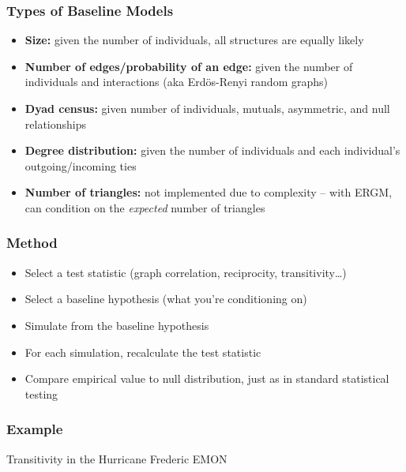 \documentclass{beamer}
\begin{document}
\begin{frame}
\frametitle{Types of Baseline Models}
\begin{itemize}
\pause
\item \textbf{Size:} given the number of individuals, all structures are equally likely
\pause
\item \textbf{Number of edges/probability of an edge:} given the number of individuals and interactions (aka Erd\"os-Renyi random graphs)
\pause
\item \textbf{Dyad census:} given number of individuals, mutuals, asymmetric, and null relationships
\pause
\item \textbf{Degree distribution:} given the number of individuals and each individual's outgoing/incoming ties
\pause
\item \textbf{Number of triangles:} not implemented due to complexity -- with ERGM, can condition on the \textit{expected} number of triangles
\end{itemize}
\end{frame}
\begin{frame}
\frametitle{Method}
\begin{itemize}
\pause
\item Select a test statistic (graph correlation, reciprocity, transitivity\dots)
\pause
\item Select a baseline hypothesis (what you're conditioning on)
\pause
\item Simulate from the baseline hypothesis
\pause
\item For each simulation, recalculate the test statistic
\pause
\item Compare empirical value to null distribution, just as in standard statistical testing
\end{itemize}
\end{frame}
\begin{frame}
\frametitle{Example}
Transitivity in the Hurricane Frederic EMON
\begin{columns}
\column{3cm}
\begin{itemize}
\end{itemize}
\column{8cm}
\end{columns}
\end{frame}
\end{document}
